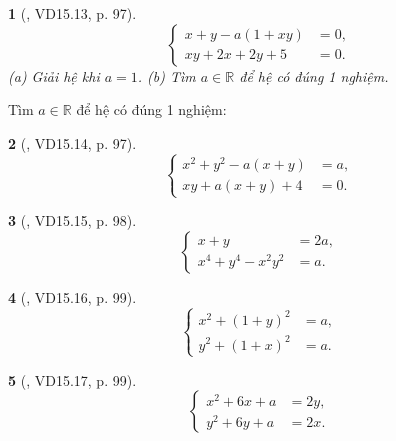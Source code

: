 \documentclass{article}
\newtheorem{baitoan}{}
\begin{document}
\begin{baitoan}[\cite{TLCT_THCS_Toan_9_dai_so}, VD15.13, p. 97]
	\begin{equation*}
		\left\{\begin{split}
			x + y - a(1 + xy) &= 0,\\
			xy + 2x + 2y + 5 &= 0.
		\end{split}\right.
	\end{equation*}
	(a) Giải hệ khi $a = 1$. (b) Tìm $a\in\mathbb{R}$ để hệ có đúng 1 nghiệm.
\end{baitoan}
Tìm $a\in\mathbb{R}$ để hệ có đúng 1 nghiệm:

\begin{baitoan}[\cite{TLCT_THCS_Toan_9_dai_so}, VD15.14, p. 97]
	\begin{equation*}
		\left\{\begin{split}
			x^2 + y^2 - a(x + y) &= a,\\
			xy + a(x + y) + 4 &= 0.
		\end{split}\right.
	\end{equation*}
\end{baitoan}

\begin{baitoan}[\cite{TLCT_THCS_Toan_9_dai_so}, VD15.15, p. 98]
	\begin{equation*}
		\left\{\begin{split}
			x + y &= 2a,\\
			x^4 + y^4 - x^2y^2 &= a.
		\end{split}\right.
	\end{equation*}
\end{baitoan}

\begin{baitoan}[\cite{TLCT_THCS_Toan_9_dai_so}, VD15.16, p. 99]
	\begin{equation*}
		\left\{\begin{split}
			x^2 + (1 + y)^2 &= a,\\
			y^2 + (1 + x)^2 &= a.
		\end{split}\right.
	\end{equation*}
\end{baitoan}

\begin{baitoan}[\cite{TLCT_THCS_Toan_9_dai_so}, VD15.17, p. 99]
	\begin{equation*}
		\left\{\begin{split}
			x^2 + 6x + a &= 2y,\\
			y^2 + 6y + a &= 2x.
		\end{split}\right.
	\end{equation*}
\end{baitoan}
\end{document}
